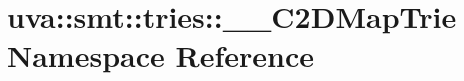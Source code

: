 \hypertarget{namespaceuva_1_1smt_1_1tries_1_1_____c2_d_map_trie}{}\section{uva\+:\+:smt\+:\+:tries\+:\+:\+\_\+\+\_\+\+C2\+D\+Map\+Trie Namespace Reference}
\label{namespaceuva_1_1smt_1_1tries_1_1_____c2_d_map_trie}
